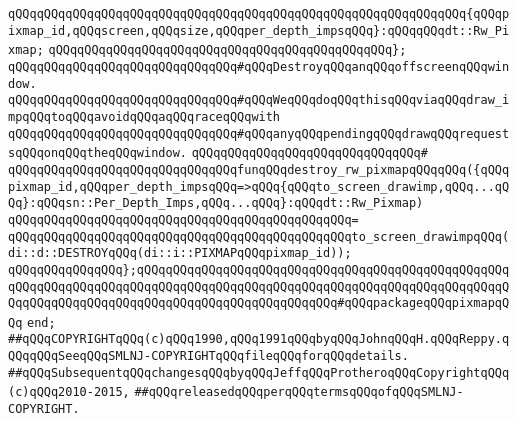 \newline
\verb|qQQqqQQqqQQqqQQqqQQqqQQqqQQqqQQqqQQqqQQqqQQqqQQqqQQqqQQqqQQqqQQq{qQQqpixmap_id,qQQqscreen,qQQqsize,qQQqper_depth_impsqQQq}:qQQqqQQqdt::Rw_Pixmap;|\newline
\verb|qQQqqQQqqQQqqQQqqQQqqQQqqQQqqQQqqQQqqQQqqQQqqQQq};|\newline
\newline
\verb|qQQqqQQqqQQqqQQqqQQqqQQqqQQqqQQq#qQQqDestroyqQQqanqQQqoffscreenqQQqwindow.|\newline
\verb|qQQqqQQqqQQqqQQqqQQqqQQqqQQqqQQq#qQQqWeqQQqdoqQQqthisqQQqviaqQQqdraw_impqQQqtoqQQqavoidqQQqaqQQqraceqQQqwith|\newline
\verb|qQQqqQQqqQQqqQQqqQQqqQQqqQQqqQQq#qQQqanyqQQqpendingqQQqdrawqQQqrequestsqQQqonqQQqtheqQQqwindow.|\newline
\verb|qQQqqQQqqQQqqQQqqQQqqQQqqQQqqQQq#|\newline
\verb|qQQqqQQqqQQqqQQqqQQqqQQqqQQqqQQqfunqQQqdestroy_rw_pixmapqQQqqQQq({qQQqpixmap_id,qQQqper_depth_impsqQQq=>qQQq{qQQqto_screen_drawimp,qQQq...qQQq}:qQQqsn::Per_Depth_Imps,qQQq...qQQq}:qQQqdt::Rw_Pixmap)|\newline
\verb|qQQqqQQqqQQqqQQqqQQqqQQqqQQqqQQqqQQqqQQqqQQqqQQq=|\newline
\verb|qQQqqQQqqQQqqQQqqQQqqQQqqQQqqQQqqQQqqQQqqQQqqQQqto_screen_drawimpqQQq(di::d::DESTROYqQQq(di::i::PIXMAPqQQqpixmap_id));|\newline
\newline
\verb|qQQqqQQqqQQqqQQq};qQQqqQQqqQQqqQQqqQQqqQQqqQQqqQQqqQQqqQQqqQQqqQQqqQQqqQQqqQQqqQQqqQQqqQQqqQQqqQQqqQQqqQQqqQQqqQQqqQQqqQQqqQQqqQQqqQQqqQQqqQQqqQQqqQQqqQQqqQQqqQQqqQQqqQQqqQQqqQQqqQQqqQQq#qQQqpackageqQQqpixmapqQQq|\newline
\verb|end;|\newline
\newline
\newline
\newline
\verb|##qQQqCOPYRIGHTqQQq(c)qQQq1990,qQQq1991qQQqbyqQQqJohnqQQqH.qQQqReppy.qQQqqQQqSeeqQQqSMLNJ-COPYRIGHTqQQqfileqQQqforqQQqdetails.|\newline
\verb|##qQQqSubsequentqQQqchangesqQQqbyqQQqJeffqQQqProtheroqQQqCopyrightqQQq(c)qQQq2010-2015,|\newline
\verb|##qQQqreleasedqQQqperqQQqtermsqQQqofqQQqSMLNJ-COPYRIGHT.|\newline

